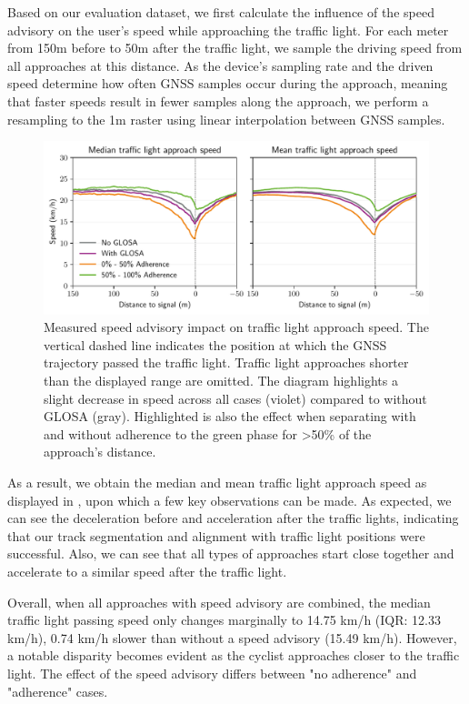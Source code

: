 Based on our evaluation dataset, we first calculate the influence of the speed advisory on the user's speed while approaching the traffic light. For each meter from 150m before to 50m after the traffic light, we sample the driving speed from all approaches at this distance. As the device's sampling rate and the driven speed determine how often GNSS samples occur during the approach, meaning that faster speeds result in fewer samples along the approach, we perform a resampling to the 1m raster using linear interpolation between GNSS samples.

\begin{figure}[t]
\caption{Measured speed advisory impact on traffic light approach speed. The vertical dashed line indicates the position at which the GNSS trajectory passed the traffic light. Traffic light approaches shorter than the displayed range are omitted. The diagram highlights a slight decrease in speed across all cases (violet) compared to without GLOSA (gray). Highlighted is also the effect when separating with and without adherence to the green phase for >50\% of the approach's distance.}\label{fig:impacts-approach-speed}
\includegraphics[width=\linewidth]{images/impacts-approach-speed.pdf}
\end{figure}

As a result, we obtain the median and mean traffic light approach speed as displayed in , upon which a few key observations can be made. As expected, we can see the deceleration before and acceleration after the traffic lights, indicating that our track segmentation and alignment with traffic light positions were successful. Also, we can see that all types of approaches start close together and accelerate to a similar speed after the traffic light. 

Overall, when all approaches with speed advisory are combined, the median traffic light passing speed only changes marginally to 14.75 km/h (IQR: 12.33 km/h), 0.74 km/h slower than without a speed advisory (15.49 km/h). However, a notable disparity becomes evident as the cyclist approaches closer to the traffic light. The effect of the speed advisory differs between "no adherence" and "adherence" cases.

